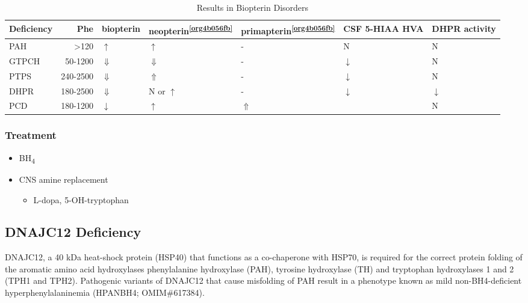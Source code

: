 \documentclass[12pt]{scrartcl}
\begin{document}
\begin{table}[htbp]
\caption{\label{tab:orga5c4f4c}Results in Biopterin Disorders}
\centering
\begin{tabular}{lrlllll}
Deficiency & Phe & biopterin\footnotemark & neopterin\textsuperscript{\ref{org4b056fb}} & primapterin\textsuperscript{\ref{org4b056fb}} & CSF 5-HIAA HVA & DHPR activity\\
\hline
PAH & \textgreater{}120 & \(\uparrow\) & \(\uparrow\) & - & N & N\\
GTPCH & 50-1200 & \(\Downarrow\) & \(\Downarrow\) & - & \(\downarrow\) & N\\
PTPS & 240-2500 & \(\Downarrow\) & \(\Uparrow\) & - & \(\downarrow\) & N\\
DHPR & 180-2500 & \(\Downarrow\) & N or \(\uparrow\) & - & \(\downarrow\) & \(\downarrow\)\\
PCD & 180-1200 & \(\downarrow\) & \(\uparrow\) & \(\Uparrow\) &  & N\\
\end{tabular}
\end{table}

\subsubsection{Treatment}
\label{sec:org406ed90}
\begin{itemize}
\item BH\textsubscript{4}
\item CNS amine replacement
\begin{itemize}
\item L-dopa, 5-OH-tryptophan
\end{itemize}
\end{itemize}



\subsection{DNAJC12 Deficiency}
\label{sec:org75da760}

DNAJC12, a 40 kDa heat-shock protein (HSP40) that functions as a
co-chaperone with HSP70, is required for the correct protein folding
of the aromatic amino acid hydroxylases phenylalanine hydroxylase
(PAH), tyrosine hydroxylase (TH) and tryptophan hydroxylases 1 and 2
(TPH1 and TPH2). Pathogenic variants of DNAJC12 that cause misfolding
of PAH result in a phenotype known as mild non-BH4-deficient
hyperphenylalaninemia (HPANBH4; OMIM\#617384).
\end{document}
